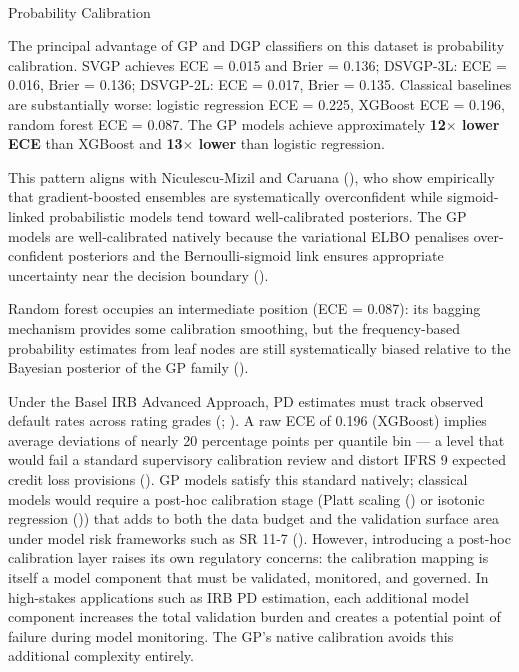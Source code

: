 \documentclass[
  letterpaper,
  DIV=11,
  numbers=noendperiod]{scrartcl}
\makeatletter
\let\oldparagraph\paragraph
\renewcommand{\paragraph}{
    \@ifstar
      \xxxParagraphStar
      \xxxParagraphNoStar
  }
\newcommand{\xxxParagraphStar}[1]{\oldparagraph*{#1}\mbox{}}
\newcommand{\xxxParagraphNoStar}[1]{\oldparagraph{#1}\mbox{}}
\makeatother
\begin{document}
\paragraph{Probability Calibration}\label{sec-uci-large-calibration}

The principal advantage of GP and DGP classifiers on this dataset is
probability calibration. SVGP achieves ECE = 0.015 and Brier = 0.136;
DSVGP-3L: ECE = 0.016, Brier = 0.136; DSVGP-2L: ECE = 0.017, Brier =
0.135. Classical baselines are substantially worse: logistic regression
ECE = 0.225, XGBoost ECE = 0.196, random forest ECE = 0.087. The GP
models achieve approximately \textbf{12\(\times\) lower ECE} than
XGBoost and \textbf{13\(\times\) lower} than logistic regression.

This pattern aligns with Niculescu-Mizil and Caruana
(), who show
empirically that gradient-boosted ensembles are systematically
overconfident while sigmoid-linked probabilistic models tend toward
well-calibrated posteriors. The GP models are well-calibrated natively
because the variational ELBO penalises over-confident posteriors and the
Bernoulli-sigmoid link ensures appropriate uncertainty near the decision
boundary ().

Random forest occupies an intermediate position (ECE = 0.087): its
bagging mechanism provides some calibration smoothing, but the
frequency-based probability estimates from leaf nodes are still
systematically biased relative to the Bayesian posterior of the GP
family ().

Under the Basel IRB Advanced Approach, PD estimates must track observed
default rates across rating grades
(;
). A raw ECE of 0.196 (XGBoost) implies average deviations of
nearly 20 percentage points per quantile bin --- a level that would fail
a standard supervisory calibration review and distort IFRS 9 expected
credit loss provisions (). GP models satisfy this standard
natively; classical models would require a post-hoc calibration stage
(Platt scaling () or
isotonic regression ()) that adds to both the data budget and the validation
surface area under model risk frameworks such as SR 11-7
(). However, introducing a post-hoc calibration layer
raises its own regulatory concerns: the calibration mapping is itself a
model component that must be validated, monitored, and governed. In
high-stakes applications such as IRB PD estimation, each additional
model component increases the total validation burden and creates a
potential point of failure during model monitoring. The GP's native
calibration avoids this additional complexity entirely.
\end{document}
